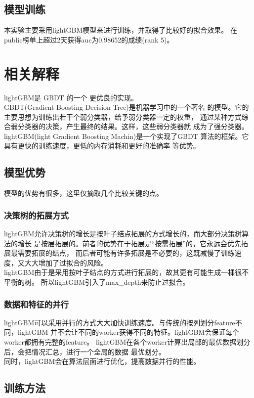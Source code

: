 \documentclass[a4paper]{article}
\begin{document}
\subsection{模型训练}\label{subsec:train}
本实验主要采用lightGBM模型来进行训练，并取得了比较好的拟合效果。
在public榜单上超过2天获得auc为0.98652的成绩(rank 5)。

\section{相关解释}
lightGBM是 GBDT  的一个
更优良的实现。\\

GBDT(Gradient Boosting Decision Tree)是机器学习中的一个著名
的模型。它的主要思想为训练出若干个弱分类器，给予弱分类器一定的权重，
通过某种方式综合弱分类器的决策，产生最终的结果。这样，这些弱分类器就
成为了强分类器。\\

lightGBM(light Gradient Boosting Machin)是一个实现了GBDT
算法的框架。它具有更快的训练速度，更低的内存消耗和更好的准确率
等优势。
\subsection{模型优势}
模型的优势有很多，这里仅摘取几个比较关键的点。
\subsubsection{决策树的拓展方式}
lightGBM允许决策树的增长是按叶子结点拓展的方式增长的，而大部分决策树算法的增长
是按层拓展的。前者的优势在于拓展是``按需拓展''的，它永远会优先拓展最需要拓展的结点，
而后者可能有许多拓展是不必要的，这既减慢了训练速度，又大大增加了过拟合的风险。\\

lightGBM由于是采用按叶子结点的方式进行拓展的，故其更有可能生成一棵很不平衡的树。
所以lightGBM引入了max\_depth来防止过拟合。
\subsubsection{数据和特征的并行}
lightGBM可以采用并行的方式大大加快训练速度。与传统的按列划分feature不同，lightGBM
并不会让不同的worker获得不同的特征。lightGBM会保证每个worker都拥有完整的feature。
lightGBM在各个worker计算出局部的最优数据划分后，会把情况汇总，进行一个全局的数据
最优划分。\\

同时，lightGBM会在算法层面进行优化，提高数据并行的性能。

\subsection{训练方法}
\end{document}
